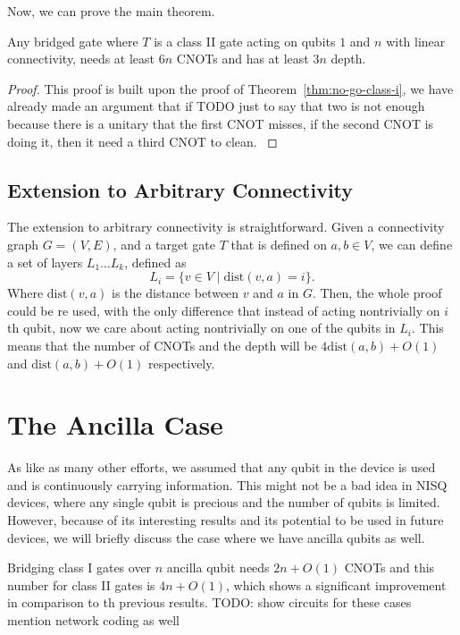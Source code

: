 Now, we can prove the main theorem.

\begin{theorem}\label{thm:no-go-class-ii}
  Any bridged gate where $T$ is a class II gate acting on qubits $1$ and $n$ with linear connectivity, needs at least $6n$ CNOTs and has at least $3n$ depth.
\end{theorem}
\begin{proof}
  This proof is built upon the proof of Theorem~\ref{thm:no-go-class-i}, we have already made an argument that if 
  { \color{red} TODO just to say that two is not enough because there is a unitary that the first CNOT misses, if the second CNOT is doing it, then it need a third CNOT to clean. }
\end{proof}
\subsection{Extension to Arbitrary Connectivity}

The extension to arbitrary connectivity is straightforward. Given a connectivity graph $G = (V, E)$, and a target gate $T$ that is defined on $a,b \in V$, we can define a set of layers $L_1 \dots L_k$, defined as
\begin{equation}
  L_i = \{ v \in V \mid \mathrm{dist}(v, a) = i \}.
\end{equation}
Where $\mathrm{dist}(v, a)$ is the distance between $v$ and $a$ in $G$. Then, the whole proof could be re used, with the only difference that instead of acting nontrivially on $i$th qubit, now we care about acting nontrivially on one of the qubits in $L_i$. This means that the number of CNOTs and the depth will be $4\mathrm{dist}(a,b) + O(1)$ and $\mathrm{dist}(a,b) + O(1)$ respectively. 

\section{The Ancilla Case}

As like as many other efforts, we assumed that any qubit in the device is used and is continuously carrying information. This might not be a bad idea in NISQ devices, where any single qubit is precious and the number of qubits is limited. However, because of its interesting results and its potential to be used in future devices, we will briefly discuss the case where we have ancilla qubits as well.

Bridging class I gates over $n$ ancilla qubit needs $2n + O(1)$ CNOTs and this number for class II gates is $4n + O(1)$, which shows a significant improvement in comparison to th previous results.
{ \color{red} TODO: show circuits for these cases 
  mention network coding as well \cite{ho2008}
}